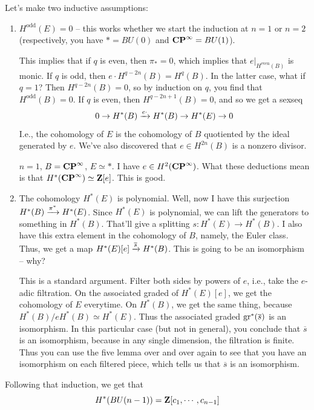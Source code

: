 Let's make two inductive assumptions:
\begin{enumerate}
    \item $H^\mathrm{odd}(E) = 0$ -- this works whether we start the induction at $n=1$ or $n=2$ (respectively, you have $\ast = BU(0)$ and $\mathbf{CP}^\infty = BU(1)$).

	This implies that if $q$ is even, then $\pi_\ast = 0$, which implies that $e|_{H^\mathrm{even}(B)}$ is monic.
	If $q$ is odd, then $e\cdot H^{q-2n}(B) = H^q(B)$.
	In the latter case, what if $q=1$?
	Then $H^{q-2n}(B) = 0$, so by induction on $q$, you find that $H^\mathrm{odd}(B) = 0$.
	If $q$ is even, then $H^{q-2n+1}(B) = 0$, and so we get a sexseq
	$$
	0\to H^\ast(B) \xrightarrow{{e\cdot}} H^\ast(B) \to H^\ast(E) \to 0
	$$
	I.e., the cohomology of $E$ is the cohomology of $B$ quotiented by the ideal generated by $e$.
	We've also discovered that $e\in H^{2n}(B)$ is a nonzero divisor.

	\begin{example}
	    $n=1$, $B=\mathbf{CP}^\infty$, $E\simeq \ast$.
	    I have $e\in H^2(\mathbf{CP}^\infty)$.
	    What these deductions mean is that $H^\ast(\mathbf{CP}^\infty) \simeq \mathbf Z[e]$.
	    This is good.
	\end{example}
    \item The cohomology $H^\ast(E)$ is polynomial.
	Well, now I have this surjection $H^\ast(B) \xrightarrow{{\pi^\ast}} H^\ast(E)$.
	Since $H^\ast(E)$ is polynomial, we can lift the generators to something in $H^\ast(B)$.
	That'll give a splitting $s:H^\ast(E) \to H^\ast(B)$.
	I also have this extra element in the cohomology of $B$, namely, the Euler class.
	Thus, we get a map $H^\ast(E)[e] \xrightarrow{{\overline{s}}} H^\ast(B)$.
	This is going to be an isomorphism -- why?

	This is a standard argument.
	Filter both sides by powers of $e$, i.e., take the $e$-adic filtration.
	On the associated graded of $H^\ast(E)[e]$, we get the cohomology of $E$ everytime.
	On $H^\ast(B)$, we get the same thing, because $H^\ast(B)/eH^\ast(B) \simeq H^\ast(E)$.
	Thus the associated graded $\mathrm{gr}^\ast(\overline{s})$ is an isomorphism.
	In this particular case (but not in general), you conclude that $\overline{s}$ is an isomorphism, because in any single dimension, the filtration is finite.
	Thus you can use the five lemma over and over again to see that you have an isomorphism on each filtered piece, which tells us that $\overline{s}$ is an isomorphism.
\end{enumerate}
Following that induction, we get that
$$
H^\ast(BU(n-1)) = \mathbf Z[c_1,\cdots,c_{n-1}]
$$
